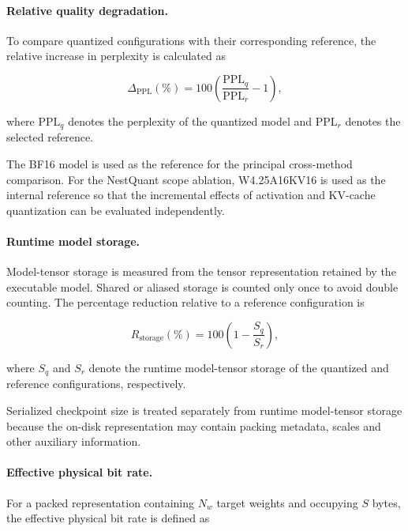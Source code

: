 \paragraph{Relative quality degradation.}

To compare quantized configurations with their corresponding reference,
the relative increase in perplexity is calculated as

\begin{equation}
\Delta_{\mathrm{PPL}}(\%)
=
100
\left(
\frac{\mathrm{PPL}_{q}}
     {\mathrm{PPL}_{r}}
-1
\right),
\label{eq:relative-ppl-increase}
\end{equation}

where \(\mathrm{PPL}_{q}\) denotes the perplexity of the quantized model
and \(\mathrm{PPL}_{r}\) denotes the selected reference.

The BF16 model is used as the reference for the principal cross-method
comparison. For the NestQuant scope ablation,
W4.25A16KV16 is used as the internal reference so that the incremental
effects of activation and KV-cache quantization can be evaluated
independently.


\paragraph{Runtime model storage.}

Model-tensor storage is measured from the tensor representation retained
by the executable model. Shared or aliased storage is counted only once
to avoid double counting. The percentage reduction relative to a
reference configuration is

\begin{equation}
R_{\mathrm{storage}}(\%)
=
100
\left(
1-
\frac{S_q}{S_r}
\right),
\label{eq:storage-reduction}
\end{equation}

where \(S_q\) and \(S_r\) denote the runtime model-tensor storage of the
quantized and reference configurations, respectively.

Serialized checkpoint size is treated separately from runtime
model-tensor storage because the on-disk representation may contain
packing metadata, scales and other auxiliary information.


\paragraph{Effective physical bit rate.}

For a packed representation containing \(N_w\) target weights and
occupying \(S\) bytes, the effective physical bit rate is defined as

